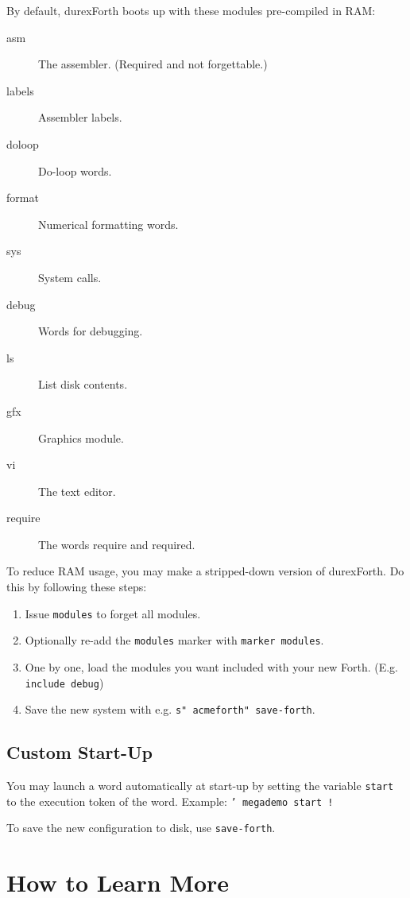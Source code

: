 By default, durexForth boots up with these modules pre-compiled in RAM:

\begin{description}
    \item[asm] The assembler. (Required and not forgettable.)
    \item[labels] Assembler labels.
    \item[doloop] Do-loop words.
    \item[format] Numerical formatting words.
    \item[sys] System calls.
    \item[debug] Words for debugging.
    \item[ls] List disk contents.
    \item[gfx] Graphics module.
    \item[vi] The text editor.
    \item[require] The words require and required.
\end{description}

To reduce RAM usage, you may make a stripped-down version of durexForth. Do this by following these steps:

\begin{enumerate}
\item Issue \texttt{modules} to forget all modules.
\item Optionally re-add the \texttt{modules} marker with \texttt{marker modules}.
\item One by one, load the modules you want included with your new Forth. (E.g. \texttt{include debug})
\item Save the new system with e.g. \texttt{s" acmeforth" save-forth}.
\end{enumerate}

\subsection{Custom Start-Up}

You may launch a word automatically at start-up by setting the variable \texttt{start} to the execution token of the word.  Example: \texttt{' megademo start !}

To save the new configuration to disk, use \texttt{save-forth}.

\section{How to Learn More}

